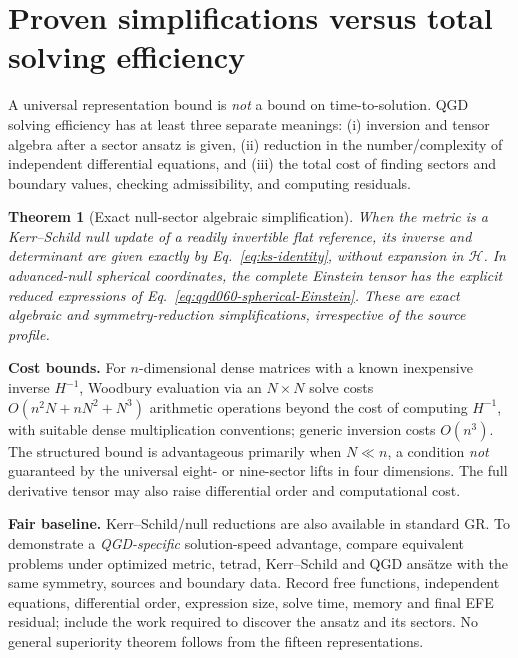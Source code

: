 \documentclass[11pt,a4paper]{article}
\newtheorem{theorem}{Theorem}[section]
\begin{document}
\section{Proven simplifications versus total solving efficiency}\label{sec:efficiency}
A universal representation bound is \emph{not} a bound on time-to-solution. QGD solving efficiency has at least three separate meanings: (i) inversion and tensor algebra after a sector ansatz is given, (ii) reduction in the number/complexity of independent differential equations, and (iii) the total cost of finding sectors and boundary values, checking admissibility, and computing residuals.

\begin{theorem}[Exact null-sector algebraic simplification]\label{thm:ks-efficiency}
When the metric is a Kerr--Schild null update of a readily invertible flat reference, its inverse and determinant are given exactly by Eq.~\eqref{eq:ks-identity}, without expansion in \(\mathcal H\). In advanced-null spherical coordinates, the complete Einstein tensor has the explicit reduced expressions of Eq.~\eqref{eq:qgd060-spherical-Einstein}. These are exact algebraic and symmetry-reduction simplifications, irrespective of the source profile.
\end{theorem}
\noindent\textbf{Cost bounds.} For \(n\)-dimensional dense matrices with a known inexpensive inverse \(H^{-1}\), Woodbury evaluation via an \(N\times N\) solve costs \(O(n^2N+nN^2+N^3)\) arithmetic operations beyond the cost of computing \(H^{-1}\), with suitable dense multiplication conventions; generic inversion costs \(O(n^3)\). The structured bound is advantageous primarily when \(N\ll n\), a condition \emph{not} guaranteed by the universal eight- or nine-sector lifts in four dimensions. The full derivative tensor may also raise differential order and computational cost.

\noindent\textbf{Fair baseline.} Kerr--Schild/null reductions are also available in standard GR. To demonstrate a \emph{QGD-specific} solution-speed advantage, compare equivalent problems under optimized metric, tetrad, Kerr--Schild and QGD ans\"atze with the same symmetry, sources and boundary data. Record free functions, independent equations, differential order, expression size, solve time, memory and final EFE residual; include the work required to discover the ansatz and its sectors. No general superiority theorem follows from the fifteen representations.
\end{document}
